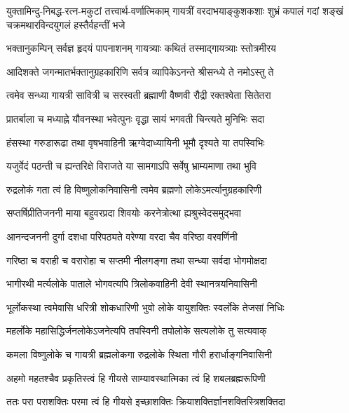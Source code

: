 
{युक्तामिन्दु-निबद्ध-रत्न-मकुटां तत्त्वार्थ-वर्णात्मिकाम्}
{गायत्रीं वरदाभयाङ्कुशकशाः शुभ्रं कपालं गदां}
{शङ्खं चक्रमथारविन्दयुगलं हस्तैर्वहन्तीं भजे}

\twolineshloka
{भक्तानुकम्पिन् सर्वज्ञ हृदयं पापनाशनम्}
{गायत्र्याः कथितं तस्माद्गायत्र्याः स्तोत्रमीरय}

\twolineshloka
{आदिशक्ते जगन्मातर्भक्तानुग्रहकारिणि}
{सर्वत्र व्यापिकेऽनन्ते श्रीसन्ध्ये ते नमोऽस्तु ते}

\twolineshloka
{त्वमेव सन्ध्या गायत्री सावित्री च सरस्वती}
{ब्रह्माणी वैष्णवी रौद्री रक्तश्वेता सितेतरा}

\twolineshloka
{प्रातर्बाला च मध्याह्ने यौवनस्था भवेत्पुनः}
{वृद्धा सायं भगवती चिन्त्यते मुनिभिः सदा}

\twolineshloka
{हंसस्था गरुडारूढा तथा वृषभवाहिनी}
{ऋग्वेदाध्यायिनी भूमौ दृश्यते या तपस्विभिः}

\twolineshloka
{यजुर्वेदं पठन्ती च ह्यन्तरिक्षे विराजते}
{या सामगाऽपि सर्वेषु भ्राम्यमाणा तथा भुवि}

\twolineshloka
{रुद्रलोकं गता त्वं हि विष्णुलोकनिवासिनी}
{त्वमेव ब्रह्मणो लोकेऽमर्त्यानुग्रहकारिणी}

\twolineshloka
{सप्तर्षिप्रीतिजननी माया बहुवरप्रदा}
{शिवयोः करनेत्रोत्था ह्यश्रुस्वेदसमुद्भवा}

\twolineshloka
{आनन्दजननी दुर्गा दशधा परिपठ्यते}
{वरेण्या वरदा चैव वरिष्ठा वरवर्णिनी}

\twolineshloka
{गरिष्ठा च वराही च वरारोहा च सप्तमी}
{नीलगङ्गा तथा सन्ध्या सर्वदा भोगमोक्षदा}

\twolineshloka
{भागीरथी मर्त्यलोके पाताले भोगवत्यपि}
{त्रिलोकवाहिनी देवी स्थानत्रयनिवासिनी}

\twolineshloka
{भूर्लोकस्था त्वमेवासि धरित्री शोकधारिणी}
{भुवो लोके वायुशक्तिः स्वर्लोके तेजसां निधिः}

\twolineshloka
{महर्लोके महासिद्धिर्जनलोकेऽजनेत्यपि}
{तपस्विनी तपोलोके सत्यलोके तु सत्यवाक्}

\twolineshloka
{कमला विष्णुलोके च गायत्री ब्रह्मलोकगा}
{रुद्रलोके स्थिता गौरी हरार्धाङ्गनिवासिनी}

\twolineshloka
{अहमो महतश्चैव प्रकृतिस्त्वं हि गीयसे}
{साम्यावस्थात्मिका त्वं हि शबलब्रह्मरूपिणी}

\twolineshloka
{ततः परा पराशक्तिः परमा त्वं हि गीयसे}
{इच्छाशक्तिः क्रियाशक्तिर्ज्ञानशक्तिस्त्रिशक्तिदा}

